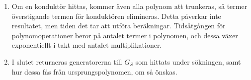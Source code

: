\begin{enumerate}
\item Om en konduktör hittas, kommer även alla polynom att trunkeras, så termer överstigande termen för konduktören elimineras. Detta påverkar inte resultatet, men tiden det tar att utföra beräkningar. Tidsåtgången för polynomoperationer beror på antalet termer i polynomen, och dessa växer exponentiellt i takt med antalet multiplikationer.

\item I slutet returneras generatorerna till $G_S$ som hittats under sökningen, samt hur dessa fås från ursprungspolynomen, om så önskas.
\end{enumerate}

